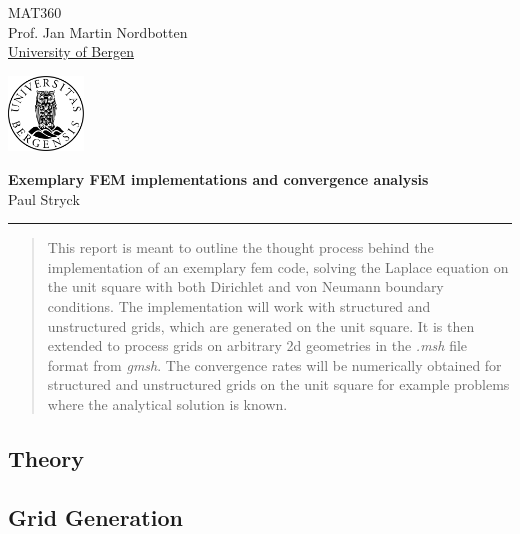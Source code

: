 \documentclass[11pt,a4paper]{article}
\begin{document}
\usetikzlibrary{positioning}

\pagestyle{plain}

\begin{multicols}{2}
  \begin{flushleft}
    MAT360 \\
    Prof. Jan Martin Nordbotten\\
    \underline{University of Bergen}
  \end{flushleft}
  \vfill\null
  \columnbreak

  \begin{flushright}
    \includegraphics[height=2cm]{assets/uib.logo.png}
  \end{flushright}
\end{multicols}

\begin{center}
\textbf{\large Exemplary FEM implementations and convergence analysis}\\
Paul Stryck\\
\end{center}
\rule{\linewidth}{0.1mm}



\begin{abstract}
    \noindent
    This report is meant to outline the thought process behind the implementation of an exemplary fem code,
    solving the Laplace equation on the unit square with both Dirichlet and von Neumann boundary conditions.
    The implementation will work with structured and unstructured grids, which are generated on the unit square.
    It is then extended to process grids on arbitrary 2d geometries in the {\it .msh} file format from {\it gmsh}.
    The convergence rates will be numerically obtained for structured and unstructured grids on the unit square
    for example problems where the analytical solution is known.
\end{abstract}

\begin{multicols}{2}

  \subsection*{Theory}
  \subsection*{Grid Generation}

\end{multicols}
\end{document}
